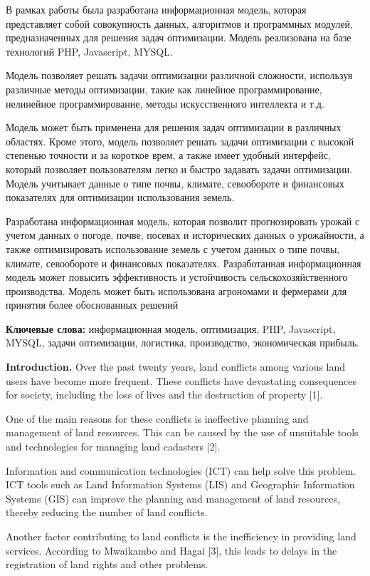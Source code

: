 В рамках работы была разработана информационная модель, которая
представляет собой совокупность данных, алгоритмов и программных
модулей, предназначенных для решения задач оптимизации. Модель
реализована на базе технологий PHP, Javascript, MYSQL.

Модель позволяет решать задачи оптимизации различной сложности,
используя различные методы оптимизации, такие как линейное
программирование, нелинейное программирование, методы искусственного
интеллекта и т.д.

Модель может быть применена для решения задач оптимизации в различных
областях. Кроме этого, модель позволяет решать задачи оптимизации с
высокой степенью точности и за короткое врем, а также имеет удобный
интерфейс, который позволяет пользователям легко и быстро задавать
задачи оптимизации. Модель учитывает данные о типе почвы, климате,
севообороте и финансовых показателях для оптимизации использования
земель.

Разработана информационная модель, которая позволит прогнозировать
урожай с учетом данных о погоде, почве, посевах и исторических данных о
урожайности, а также оптимизировать использование земель с учетом данных
о типе почвы, климате, севообороте и финансовых показателях.
Разработанная информационная модель может повысить эффективность и
устойчивость сельскохозяйственного производства. Модель может быть
использована агрономами и фермерами для принятия более обоснованных
решений

\textbf{Ключевые слова:} информационная модель, оптимизация, PHP,
Javascript, MYSQL, задачи оптимизации, логистика, производство,
экономическая прибыль.

\textbf{Introduction.} Over the past twenty years, land conflicts among
various land users have become more frequent. These conflicts have
devastating consequences for society, including the loss of lives and
the destruction of property {[}1{]}.

One of the main reasons for these conflicts is ineffective planning and
management of land resources. This can be caused by the use of
unsuitable tools and technologies for managing land cadasters {[}2{]}.

Information and communication technologies (ICT) can help solve this
problem. ICT tools such as Land Information Systems (LIS) and Geographic
Information Systems (GIS) can improve the planning and management of
land resources, thereby reducing the number of land conflicts.

Another factor contributing to land conflicts is the inefficiency in
providing land services. According to Mwaikambo and Hagai {[}3{]}, this
leads to delays in the registration of land rights and other problems.

